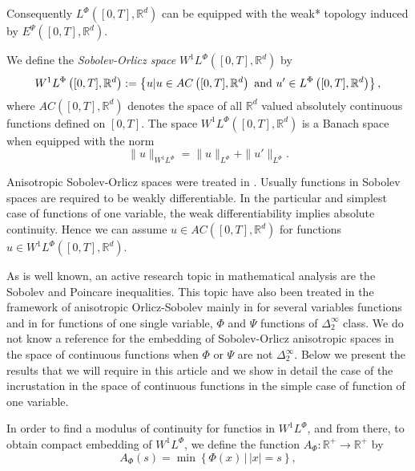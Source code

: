 \documentclass[twoside]{article}
\theoremstyle{remark}
\newcommand{\orlnor}{\|_{L^{\Phi}}}
\newcommand{\lphi}{L^{\Phi}}
\newcommand{\ephi}{E^{\Phi}}
\newcommand{\wphi}{W^{1}\lphi}
\newcommand{\wphie}{W^{1}\ephi}
\newcommand{\rr}{\mathbb{R}}
\newcommand{\epsi}{E^{\Psi}}
\begin{document}
Consequently  $\lphi\left([0,T],\rr^d\right)$ can be equipped with the weak* topology induced by $\epsi\left([0,T],\rr^d\right)$.






We define the \emph{Sobolev-Orlicz space} $\wphi\left([0,T],\rr^d\right)$ by
\[\wphi\left([0,T],\rr^d\right):=\left\{u| u\in AC\left([0,T],\rr^d\right) \hbox{ and } u'\in \lphi\left([0,T],\rr^d\right)\right\},\]
where $AC\left([0,T],\rr^d\right)$ denotes the space of all $\rr^d$ valued absolutely continuous functions defined on $[0,T]$. The space $\wphi\left([0,T],\rr^d\right)$ is a Banach space when equipped with the norm
\begin{equation}\label{def-norma-orlicz-sob}
\|  u  \|_{\wphi}= \|  u  \|_{\lphi} + \|u'\orlnor.
\end{equation}

Anisotropic Sobolev-Orlicz spaces were treated in \cite{cianchi2000fully,cianchi2004optimal,chamra2017anisotropic,trudinger1974imbedding}. Usually functions in Sobolev spaces are required to be weakly differentiable. In the particular and simplest case of functions of one variable, the weak differentiability implies absolute continuity. Hence we can assume $u\in AC\left([0,T],\rr^d\right)$ for functions $u\in\wphi\left([0,T],\rr^d\right)$.
% 
% 


As is well known, an active research topic in mathematical analysis are the Sobolev and Poincare inequalities. This topic have also been treated in the framework of anisotropic Orlicz-Sobolev mainly in \cite{cianchi2000fully,cianchi2004optimal,trudinger1974imbedding} for several variables functions and in \cite{chamra2017anisotropic} for functions of one single variable, $\Phi$ and $\Psi$ functions of $\Delta_2^{\infty}$ class.   We do not know a reference for the embedding of Sobolev-Orlicz anisotropic spaces in the space of continuous functions when $\Phi$ or $\Psi$ are not $\Delta_2^{\infty}$. Below we present the results that we will require in this article and we show in detail the case of the incrustation in the space of continuous functions in the simple case of function of one variable.

In order to find a modulus of continuity for functios in $\wphi$, and from there, to obtain compact embedding of $\wphi$, we define the function $A_{\Phi}:\rr^+\to\rr^+$ by
\begin{equation}\label{eq:inversa-gral}
A_{\Phi}(s)=\min\left\{\Phi(x)\,\big|\,|x|=s\right\},
\end{equation}
\end{document}
